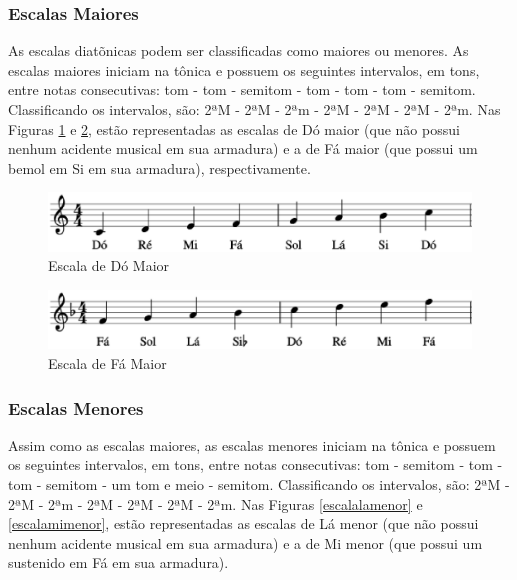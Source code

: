       \subsubsection[Escalas Maiores]{Escalas Maiores}

        As escalas diatõnicas podem ser classificadas como maiores ou menores. As escalas maiores iniciam na tônica e possuem os seguintes intervalos, em tons, entre notas consecutivas: tom - tom - semitom - tom - tom - tom - semitom. Classificando os intervalos, são: 2ªM - 2ªM - 2ªm - 2ªM - 2ªM - 2ªM - 2ªm. Nas Figuras \ref{escaladomaior} e \ref{escalafamaior}, estão representadas as escalas de Dó maior (que não possui nenhum acidente musical em sua armadura) e a de Fá maior (que possui um bemol em Si em sua armadura), respectivamente.

        \begin{figure}[htb]
          \centering
          \includegraphics[scale=0.6]{figuras/escaladomaior.eps}
          \caption{Escala de Dó Maior}
          \label{escaladomaior}
        \end{figure}

        \begin{figure}[htb]
          \centering
          \includegraphics[scale=0.6]{figuras/escalafamaior.eps}
          \caption{Escala de Fá Maior}
          \label{escalafamaior}
        \end{figure}

      \subsubsection[Escalas Menores]{Escalas Menores}

        Assim como as escalas maiores, as escalas menores iniciam na tônica e possuem os seguintes intervalos, em tons, entre notas consecutivas: tom - semitom - tom - tom - semitom - um tom e meio - semitom. Classificando os intervalos, são: 2ªM - 2ªM - 2ªm - 2ªM - 2ªM - 2ªM - 2ªm. Nas Figuras \ref{escalalamenor} e \ref{escalamimenor}, estão representadas as escalas de Lá menor (que não possui nenhum acidente musical em sua armadura) e a de Mi menor (que possui um sustenido em Fá em sua armadura).

